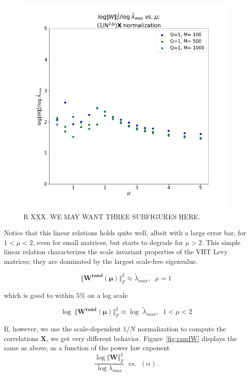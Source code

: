 \begin{figure}[!htb]
 \centering
   \includegraphics[scale=0.40]{img/LogNorm-Lmax-Scaled.png}
   \caption{R XXX.  WE MAY WANT THREE SUBFIGURES HERE.}
  \label{fig:logNormHat}
\end{figure}


Notice that this linear relations holds quite well, albeit with a large error bar, for $1<\mu<2$, even for small matrices, but starts to degrade for $\mu>2$.
This simple linear relation characterizes the scale invariant properties of the VHT Levy matrices; they are dominated by the largest scale-free eigenvalue.

$$\Vert\mathbf{W^{rand}(\mu)}\Vert^{2}_{F}\approx\tilde{\lambda}_{max},\;\;\mu=1$$


which is good to within $5\%$ on a log scale

$$\log\;\Vert\mathbf{W^{rand}(\mu)}\Vert^{2}_{F}\approx\log\;\tilde{\lambda}_{max},\;\;1<\mu<2$$


If, however, we use the scale-dependent $1/N$ normalization to compute the correlations $\mathbf{X}$, we get very different behavior.
Figure~\ref{fig:randW} displays the same as above, as a function of the power law exponent 
$$
\dfrac{\log\Vert\mathbf{W}\Vert^{2}_{F}}{\log\lambda_{max}}\;\;vs.\;\;(\alpha)  .
$$

